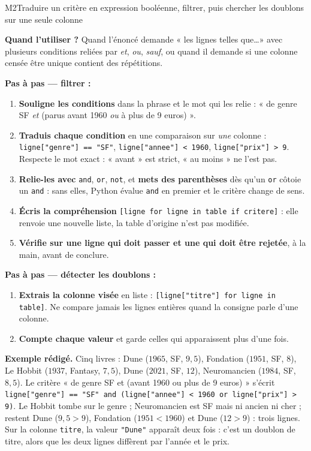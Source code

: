 \begin{fichemethode}{M2}{Traduire un critère en expression booléenne, filtrer, puis chercher les doublons sur une seule colonne}

\textbf{Quand l'utiliser ?} Quand l'énoncé demande « les lignes telles que\ldots » avec
plusieurs conditions reliées par \emph{et}, \emph{ou}, \emph{sauf}, ou quand il demande si
une colonne censée être unique contient des répétitions.

\textbf{Pas à pas --- filtrer :}
\begin{enumerate}
  \item \textbf{Souligne les conditions} dans la phrase et le mot qui les relie : « de genre SF
        \emph{et} (parus avant 1960 \emph{ou} à plus de 9 euros) ».
  \item \textbf{Traduis chaque condition} en une comparaison sur \emph{une} colonne :
        \lstinline{ligne["genre"] == "SF"}, \lstinline{ligne["annee"] < 1960},
        \lstinline{ligne["prix"] > 9}. Respecte le mot exact : « avant » est strict, « au
        moins » ne l'est pas.
  \item \textbf{Relie-les avec} \lstinline{and}, \lstinline{or}, \lstinline{not}, et
        \textbf{mets des parenthèses} dès qu'un \lstinline{or} côtoie un \lstinline{and} :
        sans elles, Python évalue \lstinline{and} en premier et le critère change de sens.
  \item \textbf{Écris la compréhension} \lstinline{[ligne for ligne in table if critere]} :
        elle renvoie une nouvelle liste, la table d'origine n'est pas modifiée.
  \item \textbf{Vérifie sur une ligne qui doit passer et une qui doit être rejetée}, à la
        main, avant de conclure.
\end{enumerate}

\textbf{Pas à pas --- détecter les doublons :}
\begin{enumerate}
  \item \textbf{Extrais la colonne visée} en liste : \lstinline{[ligne["titre"] for ligne in table]}.
        Ne compare jamais les lignes entières quand la consigne parle d'une colonne.
  \item \textbf{Compte chaque valeur} et garde celles qui apparaissent plus d'une fois.
\end{enumerate}

\textbf{Exemple rédigé.} Cinq livres : Dune ($1965$, SF, $9{,}5$), Fondation ($1951$, SF,
$8$), Le Hobbit ($1937$, Fantasy, $7{,}5$), Dune ($2021$, SF, $12$), Neuromancien ($1984$,
SF, $8{,}5$). Le critère « de genre SF et (avant 1960 ou plus de 9 euros) » s'écrit
\lstinline{ligne["genre"] == "SF" and (ligne["annee"] < 1960 or ligne["prix"] > 9)}. Le
Hobbit tombe sur le genre ; Neuromancien est SF mais ni ancien ni cher ; restent Dune
($9{,}5 > 9$), Fondation ($1951 < 1960$) et Dune ($12 > 9$) : trois lignes. Sur la colonne
\lstinline{titre}, la valeur \lstinline{"Dune"} apparaît deux fois : c'est un doublon de
titre, alors que les deux lignes diffèrent par l'année et le prix.


\end{fichemethode}
